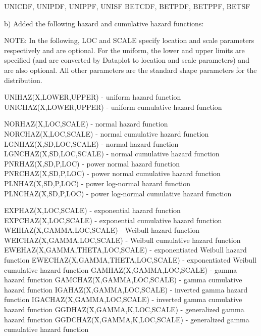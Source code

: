{          UNICDF, UNIPDF, UNIPPF, UNISF
          BETCDF, BETPDF, BETPPF, BETSF

    b) Added the following hazard and cumulative hazard functions:

       NOTE: In the following, LOC and SCALE specify location and
             scale parameters respectively and are optional.  For the
             uniform, the lower and upper limits are specified (and
             are converted by Dataplot to location and scale
             parameters) and are also optional.  All other parameters
             are the standard shape parameters for the distribution.
        
          UNIHAZ(X,LOWER,UPPER)    - uniform hazard function
          UNICHAZ(X,LOWER,UPPER)   - uniform cumulative hazard function
   
          NORHAZ(X,LOC,SCALE)       - normal hazard function
          NORCHAZ(X,LOC,SCALE)      - normal cumulative hazard function
          LGNHAZ(X,SD,LOC,SCALE)    - normal hazard function
          LGNCHAZ(X,SD,LOC,SCALE)   - normal cumulative hazard function
          PNRHAZ(X,SD,P,LOC)        - power normal hazard function
          PNRCHAZ(X,SD,P,LOC)       - power normal cumulative hazard
                                      function
          PLNHAZ(X,SD,P,LOC)        - power log-normal hazard function
          PLNCHAZ(X,SD,P,LOC)       - power log-normal cumulative
                                      hazard function
   
          EXPHAZ(X,LOC,SCALE)        - exponential hazard function
          EXPCHAZ(X,LOC,SCALE)       - exponential cumulative hazard
                                       function
          WEIHAZ(X,GAMMA,LOC,SCALE)  - Weibull hazard function
          WEICHAZ(X,GAMMA,LOC,SCALE) - Weibull cumulative hazard
                                       function
          EWEHAZ(X,GAMMA,THETA,LOC,SCALE)  - exponentiated Weibull
                                             hazard function
          EWECHAZ(X,GAMMA,THETA,LOC,SCALE) - exponentiated Weibull
                                             cumulative hazard function
          GAMHAZ(X,GAMMA,LOC,SCALE)  - gamma hazard function
          GAMCHAZ(X,GAMMA,LOC,SCALE) - gamma cumulative hazard function
          IGAHAZ(X,GAMMA,LOC,SCALE)  - inverted gamma hazard function
          IGACHAZ(X,GAMMA,LOC,SCALE) - inverted gamma cumulative hazard
                                       function
          GGDHAZ(X,GAMMA,K,LOC,SCALE)  - generalized gamma hazard
                                         function
          GGDCHAZ(X,GAMMA,K,LOC,SCALE) - generalized gamma cumulative
                                         hazard function
   
}

